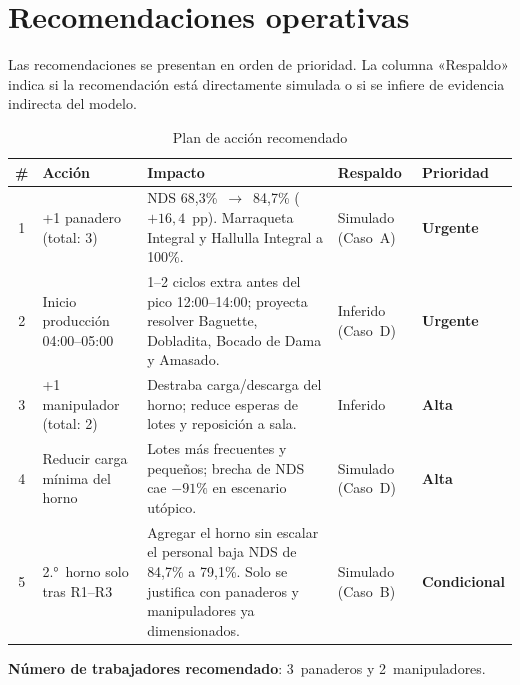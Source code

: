 \documentclass[12pt]{article}
\begin{document}
\newpage
\section{Recomendaciones operativas}

Las recomendaciones se presentan en orden de prioridad. La columna «Respaldo» indica si la recomendación está directamente simulada o si se infiere de evidencia indirecta del modelo.

\begin{table}[H]
\centering
\caption{Plan de acción recomendado}
\label{tab:recomendaciones}
\renewcommand{\arraystretch}{1.35}
\begin{tabularx}{\textwidth}{clXll}
\toprule
\rowcolor{tabhead}
\color{white}\textbf{\#} &
\color{white}\textbf{Acción} &
\color{white}\textbf{Impacto} &
\color{white}\textbf{Respaldo} &
\color{white}\textbf{Prioridad} \\
\midrule
\rowcolor{tabrow}
1 & +1 panadero (total: 3) &
NDS 68,3\%~$\to$~84,7\% ($+16,4$~pp). Marraqueta Integral y Hallulla Integral a 100\%. &
Simulado (Caso~A) &
\textcolor{rojoriesgo}{\textbf{Urgente}} \\
2 & Inicio producción 04:00--05:00 &
1--2 ciclos extra antes del pico 12:00--14:00; proyecta resolver Baguette, Dobladita, Bocado de Dama y Amasado. &
Inferido (Caso~D) &
\textcolor{rojoriesgo}{\textbf{Urgente}} \\
\rowcolor{tabrow}
3 & +1 manipulador (total: 2) &
Destraba carga/descarga del horno; reduce esperas de lotes y reposición a sala. &
Inferido &
\textcolor{naranja}{\textbf{Alta}} \\
4 & Reducir carga mínima del horno &
Lotes más frecuentes y pequeños; brecha de NDS cae $-91\%$ en escenario utópico. &
Simulado (Caso~D) &
\textcolor{naranja}{\textbf{Alta}} \\
\rowcolor{tabrow}
5 & 2.°~horno solo tras R1--R3 &
Agregar el horno sin escalar el personal baja NDS de 84,7\% a 79,1\%. Solo se justifica con panaderos y manipuladores ya dimensionados. &
Simulado (Caso~B) &
\textcolor{grisoscuro}{\textbf{Condicional}} \\
\bottomrule
\end{tabularx}
\end{table}

\medskip
\noindent\textbf{Número de trabajadores recomendado}: 3~panaderos y 2~manipuladores.
\end{document}
